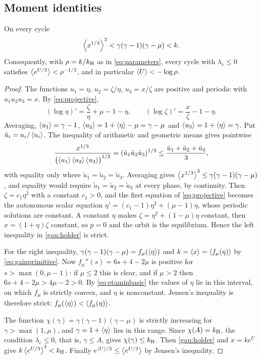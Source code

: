 \subsection{Moment identities}
\begin{proposition}\label{prop:holder}
On every cycle
\begin{equation}\label{gau:holder}
\left\langle x^{1/3}\right\rangle^3<\gamma(\gamma-1)(\gamma-\mu)<k .
\end{equation}
Consequently, with $\rho=k/k_{\mathrm H}$ as in \eqref{eq:parameters}, every cycle with $\lambda_c\le0$ satisfies $\left\langle e^{U/3}\right\rangle<\rho^{-1/3}$, and in particular $\left\langle U\right\rangle<-\log\rho$.
\end{proposition}
\begin{proof}
The functions $u_1=\eta$, $u_2=\zeta/\eta$, $u_3=x/\zeta$ are positive and periodic with $u_1u_2u_3=x$. By \eqref{eq:projective},
\[
(\log\eta)'=\frac{\zeta}{\eta}+\mu-1-\eta,\qquad(\log\zeta)'=\frac{x}{\zeta}-1-\eta .
\]
Averaging, $\left\langle u_1\right\rangle=\gamma-1$, $\left\langle u_2\right\rangle=1+\left\langle \eta\right\rangle-\mu=\gamma-\mu$ and $\left\langle u_3\right\rangle=1+\left\langle \eta\right\rangle=\gamma$. Put $\tilde u_i=u_i/\left\langle u_i\right\rangle$. The inequality of arithmetic and geometric means gives pointwise
\[
\frac{x^{1/3}}{\bigl(\left\langle u_1\right\rangle\left\langle u_2\right\rangle\left\langle u_3\right\rangle\bigr)^{1/3}}=(\tilde u_1\tilde u_2\tilde u_3)^{1/3}\le\frac{\tilde u_1+\tilde u_2+\tilde u_3}{3},
\]
with equality only where $\tilde u_1=\tilde u_2=\tilde u_3$. Averaging gives $\left\langle x^{1/3}\right\rangle^3\le\gamma(\gamma-1)(\gamma-\mu)$, and equality would require $\tilde u_1=\tilde u_2=\tilde u_3$ at every phase, by continuity. Then $\zeta=c_1\eta^2$ with a constant $c_1>0$, and the first equation of \eqref{eq:projective} becomes the autonomous scalar equation $\eta'=(c_1-1)\eta^2+(\mu-1)\eta$, whose periodic solutions are constant. A constant $\eta$ makes $\zeta=\eta^2+(1-\mu)\eta$ constant, then $x=(1+\eta)\zeta$ constant, so $p=0$ and the orbit is the equilibrium. Hence the left inequality in \eqref{gau:holder} is strict.

For the right inequality, $\gamma(\gamma-1)(\gamma-\mu)=f_\mu(\left\langle \eta\right\rangle)$ and $k=\left\langle x\right\rangle=\left\langle f_\mu(\eta)\right\rangle$ by \eqref{eq:gainprimitive}. Now $f_\mu''(s)=6s+4-2\mu$ is positive for $s>\max(0,\mu-1)$: if $\mu\le2$ this is clear, and if $\mu>2$ then $6s+4-2\mu>4\mu-2>0$. By \eqref{eq:etaminbasic} the values of $\eta$ lie in this interval, on which $f_\mu$ is strictly convex, and $\eta$ is nonconstant. Jensen's inequality is therefore strict: $f_\mu(\left\langle \eta\right\rangle)<\left\langle f_\mu(\eta)\right\rangle$.

The function $\chi(\gamma)=\gamma(\gamma-1)(\gamma-\mu)$ is strictly increasing for $\gamma>\max(1,\mu)$, and $\gamma=1+\left\langle \eta\right\rangle$ lies in this range. Since $\chi(A)=k_{\mathrm H}$, the condition $\lambda_c\le0$, that is, $\gamma\le A$, gives $\chi(\gamma)\le k_{\mathrm H}$. Then \eqref{gau:holder} and $x=ke^U$ give $k\left\langle e^{U/3}\right\rangle^3<k_{\mathrm H}$. Finally $e^{\left\langle U\right\rangle/3}\le\left\langle e^{U/3}\right\rangle$ by Jensen's inequality.
\end{proof}

